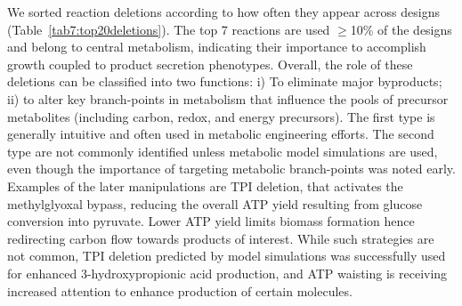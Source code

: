 {We sorted reaction deletions according to how often they appear across designs (Table~\ref{tab7:top20deletions}).
The top 7 reactions are used $\ge$10\% of the designs and belong to central metabolism, indicating their importance to accomplish growth coupled to product secretion phenotypes.
Overall, the role of these deletions can be classified into two functions: i) To eliminate major byproducts; ii) to alter key branch-points in metabolism that influence the pools of precursor metabolites (including carbon, redox, and energy precursors).
The first type is generally intuitive and often used in metabolic engineering efforts.\citep{winkler2015}
The second type are not commonly identified unless metabolic model simulations are used, \citep{tokuyama2014, venayak2018, chemler2010}
even though the importance of targeting metabolic branch-points was noted early. \citep{stephanopoulos1991}
Examples of the later manipulations are TPI deletion, that activates the methylglyoxal bypass,\citep{fong2006} reducing the overall ATP yield resulting from glucose conversion into pyruvate.
Lower ATP yield limits biomass formation hence redirecting carbon flow towards products of interest.
While such strategies are not common, TPI deletion predicted by model simulations was successfully used for enhanced 3-hydroxypropionic acid production,\citep{tokuyama2014} and ATP waisting is receiving increased attention to enhance production of certain molecules.\citep{boecker2019} %
}

